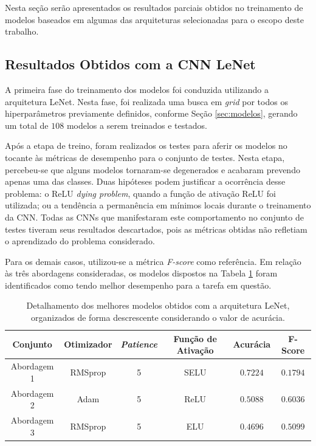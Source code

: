 
Nesta seção serão apresentados os resultados parciais obtidos no treinamento de modelos baseados em algumas das arquiteturas selecionadas para o escopo deste trabalho. 




\subsection{Resultados Obtidos com a CNN LeNet}
\label{sec:lenet}

A primeira fase do treinamento dos modelos foi conduzida utilizando a arquitetura LeNet. Nesta fase, foi realizada uma busca em \emph{grid} por todos os hiperparâmetros previamente definidos, conforme Seção \ref{sec:modelos}, gerando um total de $108$ modelos a serem treinados e testados.

Após a etapa de treino, foram realizados os testes para aferir os modelos no tocante às métricas de desempenho para o conjunto de testes. Nesta etapa, percebeu-se que alguns modelos tornaram-se degenerados e acabaram prevendo apenas uma das classes. Duas hipóteses podem justificar a ocorrência desse problema: o ReLU \emph{dying problem}, quando a função de ativação ReLU foi utilizada; ou a tendência a permanência em mínimos locais durante o treinamento da CNN. Todas as CNNs que manifestaram este comportamento no conjunto de testes tiveram seus resultados descartados, pois as métricas obtidas não refletiam o aprendizado do problema considerado.

Para os demais casos, utilizou-se a métrica \emph{F-score} como referência. Em relação às três abordagens consideradas, os modelos dispostos na Tabela \ref{tab:lenet} foram identificados como tendo melhor desempenho para a tarefa em questão.

\begin{table}[h!]
\centering
\caption{Detalhamento dos melhores modelos obtidos com a arquitetura LeNet, organizados de forma descrescente considerando o valor de acurácia.}
\label{tab:lenet}
\begin{tabular}{cccccc}
\toprule
\textbf{Conjunto} & \textbf{Otimizador} & \textbf{\emph{Patience}}  & \textbf{Função de Ativação} & \textbf{Acurácia} & \textbf{F-Score} \\
\midrule
Abordagem 1 & RMSprop & 5 & SELU & $0.7224$ & $0.1794$ \\
Abordagem 2 & Adam & 5 & ReLU & $0.5088$ & $0.6036$ \\
Abordagem 3 & RMSprop & 5 & ELU & $0.4696$ & $0.5099$ \\
\bottomrule
\end{tabular}
\end{table}


